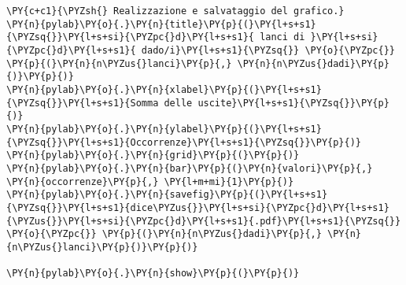 \begin{Verbatim}[label=\makebox{\href{https://github.com/unipi-physics-labs/lab1-sheets/tree/main/snippy/plasduino_dice.py}{https://github.com/.../plasduino\_dice.py}},commandchars=\\\{\}]
\PY{c+c1}{\PYZsh{} Realizzazione e salvataggio del grafico.}
\PY{n}{pylab}\PY{o}{.}\PY{n}{title}\PY{p}{(}\PY{l+s+s1}{\PYZsq{}}\PY{l+s+si}{\PYZpc{}d}\PY{l+s+s1}{ lanci di }\PY{l+s+si}{\PYZpc{}d}\PY{l+s+s1}{ dado/i}\PY{l+s+s1}{\PYZsq{}} \PY{o}{\PYZpc{}} \PY{p}{(}\PY{n}{n\PYZus{}lanci}\PY{p}{,} \PY{n}{n\PYZus{}dadi}\PY{p}{)}\PY{p}{)}
\PY{n}{pylab}\PY{o}{.}\PY{n}{xlabel}\PY{p}{(}\PY{l+s+s1}{\PYZsq{}}\PY{l+s+s1}{Somma delle uscite}\PY{l+s+s1}{\PYZsq{}}\PY{p}{)} 
\PY{n}{pylab}\PY{o}{.}\PY{n}{ylabel}\PY{p}{(}\PY{l+s+s1}{\PYZsq{}}\PY{l+s+s1}{Occorrenze}\PY{l+s+s1}{\PYZsq{}}\PY{p}{)}
\PY{n}{pylab}\PY{o}{.}\PY{n}{grid}\PY{p}{(}\PY{p}{)}
\PY{n}{pylab}\PY{o}{.}\PY{n}{bar}\PY{p}{(}\PY{n}{valori}\PY{p}{,} \PY{n}{occorrenze}\PY{p}{,} \PY{l+m+mi}{1}\PY{p}{)}
\PY{n}{pylab}\PY{o}{.}\PY{n}{savefig}\PY{p}{(}\PY{l+s+s1}{\PYZsq{}}\PY{l+s+s1}{dice\PYZus{}}\PY{l+s+si}{\PYZpc{}d}\PY{l+s+s1}{\PYZus{}}\PY{l+s+si}{\PYZpc{}d}\PY{l+s+s1}{.pdf}\PY{l+s+s1}{\PYZsq{}} \PY{o}{\PYZpc{}} \PY{p}{(}\PY{n}{n\PYZus{}dadi}\PY{p}{,} \PY{n}{n\PYZus{}lanci}\PY{p}{)}\PY{p}{)}

\PY{n}{pylab}\PY{o}{.}\PY{n}{show}\PY{p}{(}\PY{p}{)}
\end{Verbatim}
